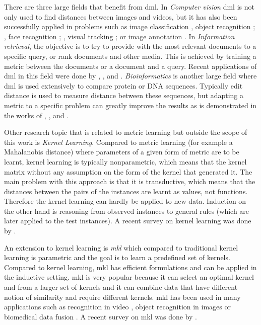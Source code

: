 \documentclass[12pt,a4paper]{report}
\begin{document}
There are three large fields that benefit from \acl{dml}. In \textit{Computer vision} \ac{dml} is not only used to find distances between images and videos, but it has also been successfully applied in problems such as image classification \citep{mensink2012metric}, object recognition \citep{frome2007learning}; \citep{verma2012learning}, face recognition \citep{guillaumin2009you}; \citep{lu2014neighborhood}, visual tracking \citep{li2012non}; \citep{jiang2012order} or image annotation \citep{guillaumin2009tagprop}. In \textit{Information retrieval}, the objective is to try to provide with the most relevant documents to a specific query, or rank documents and other media. This is achieved by training a metric between the documents or a document and a query. Recent applications of \acl{dml} in this field were done by \citep{lebanon2006metric}, \citep{lee2008rank}, \citep{mcfee2010metric} and \citep{lim2013robust}. \textit{Bioinformatics} is another large field where \acl{dml} is used extensively to compare protein or DNA sequences. Typically edit distance is used to measure distance between these sequences, but adapting a metric to a specific problem can greatly improve the results as is demonstrated in the works of \citep{xiong2006kernel}, \citep{saigo2006optimizing}, \citep{kato2010metric} and \citep{wang2012prodis}.

Other research topic that is related to metric learning but outside the scope of this work is \textit{Kernel Learning}. Compared to metric learning (for example a Mahalanobis distance) where parameters of a given form of metric are to be learnt, kernel learning is typically nonparametric, which means that the kernel matrix without any assumption on the form of the kernel that generated it. The main problem with this approach is that it is transductive, which means that the distances between the pairs of the instances are learnt as values, not functions. Therefore the kernel learning can hardly be applied to new data.  Induction on the other hand is reasoning from observed instances to general rules (which are later applied to the test instances). A recent survey on kernel learning was done by \citep{abbasnejad2012survey}.

An extension to kernel learning is \textit{\ac{mkl}} which compared to traditional kernel learning is parametric and the goal is to learn a predefined set of kernels. Compared to kernel learning, \ac{mkl} has efficient formulations and can be applied in the inductive setting. \Ac{mkl} is very popular because it can select an optimal kernel and from a larger set of kernels and it can combine data that have different notion of similarity and require different kernels. \ac{mkl} has been used in many applications such as recognition in video \citep{chen2013event}, object recognition in images \citep{bucak2014multiple} or biomedical data fusion \citep{yu20102}. A recent survey on \ac{mkl} was done by \citep{gonen2011multiple}.
\end{document}
